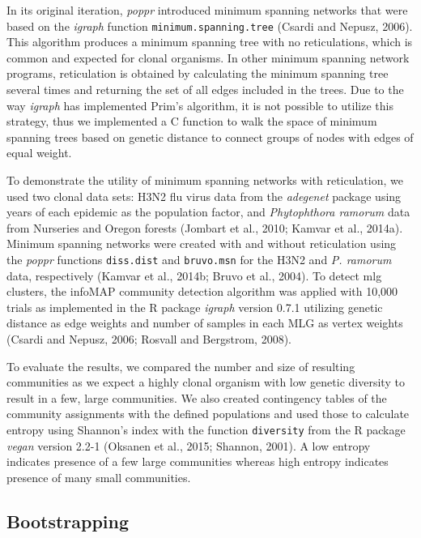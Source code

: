 \documentclass{frontiersSCNS} %
\begin{document}
In its original iteration, \emph{poppr} introduced minimum spanning
networks that were based on the \emph{igraph} function
\texttt{minimum.spanning.tree} (Csardi and Nepusz, 2006). This algorithm
produces a minimum spanning tree with no reticulations, which is common
and expected for clonal organisms. In other minimum spanning network
programs, reticulation is obtained by calculating the minimum spanning
tree several times and returning the set of all edges included in the
trees. Due to the way \emph{igraph} has implemented Prim's algorithm, it
is not possible to utilize this strategy, thus we implemented a C
function to walk the space of minimum spanning trees based on genetic
distance to connect groups of nodes with edges of equal weight.

To demonstrate the utility of minimum spanning networks with
reticulation, we used two clonal data sets: H3N2 flu virus data from the
\emph{adegenet} package using years of each epidemic as the population
factor, and \emph{Phytophthora ramorum} data from Nurseries and Oregon
forests (Jombart et al., 2010; Kamvar et al., 2014a). Minimum spanning
networks were created with and without reticulation using the
\emph{poppr} functions \texttt{diss.dist} and \texttt{bruvo.msn} for the
H3N2 and \emph{P. ramorum} data, respectively (Kamvar et al., 2014b;
Bruvo et al., 2004). To detect mlg clusters, the infoMAP community
detection algorithm was applied with 10,000 trials as implemented in the
R package \emph{igraph} version 0.7.1 utilizing genetic distance as edge
weights and number of samples in each MLG as vertex weights (Csardi and
Nepusz, 2006; Rosvall and Bergstrom, 2008).

To evaluate the results, we compared the number and size of resulting
communities as we expect a highly clonal organism with low genetic
diversity to result in a few, large communities. We also created
contingency tables of the community assignments with the defined
populations and used those to calculate entropy using Shannon's index
with the function \texttt{diversity} from the R package \emph{vegan}
version 2.2-1 (Oksanen et al., 2015; Shannon, 2001). A low entropy
indicates presence of a few large communities whereas high entropy
indicates presence of many small communities.

\subsection*{Bootstrapping}\label{bootstrapping}
\end{document}

